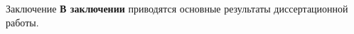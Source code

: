 \documentclass{.local/lib/classes/ndvr-super-article-standalone}
\begin{document}
    \begin{content-item}{Заключение}
        \textbf{В заключении} приводятся 
        основные результаты диссертационной работы.
    \end{content-item}
    
\end{document}
